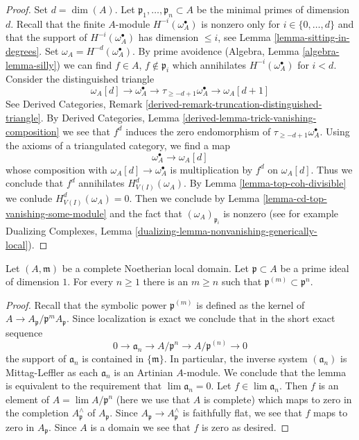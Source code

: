 \begin{proof}
Set $d = \dim(A)$. Let $\mathfrak p_1, \ldots, \mathfrak p_n \subset A$
be the minimal primes of dimension $d$.
Recall that the finite $A$-module
$H^{-i}(\omega_A^\bullet)$ is nonzero only for
$i \in \{0, \ldots, d\}$ and that the support
of $H^{-i}(\omega_A^\bullet)$ has dimension $\leq i$, see
Lemma \ref{lemma-sitting-in-degrees}.
Set $\omega_A = H^{-d}(\omega_A^\bullet)$.
By prime avoidence (Algebra, Lemma \ref{algebra-lemma-silly})
we can find $f \in A$, $f \not \in \mathfrak p_i$
which annihilates $H^{-i}(\omega_A^\bullet)$ for $i < d$.
Consider the distinguished triangle
$$
\omega_A[d] \to \omega_A^\bullet \to
\tau_{\geq -d + 1}\omega_A^\bullet \to \omega_A[d + 1]
$$
See Derived Categories, Remark
\ref{derived-remark-truncation-distinguished-triangle}.
By Derived Categories, Lemma \ref{derived-lemma-trick-vanishing-composition}
we see that $f^d$ induces the zero endomorphism of
$\tau_{\geq -d + 1}\omega_A^\bullet$.
Using the axioms of a triangulated category, we find a map
$$
\omega_A^\bullet \to \omega_A[d]
$$
whose composition with $\omega_A[d] \to \omega_A^\bullet$ is
multiplication by $f^d$ on $\omega_A[d]$.
Thus we conclude that $f^d$ annihilates $H^d_{V(I)}(\omega_A)$.
By Lemma \ref{lemma-top-coh-divisible} we conlude $H^d_{V(I)}(\omega_A) = 0$.
Then we conclude by Lemma \ref{lemma-cd-top-vanishing-some-module}
and the fact that $(\omega_A)_{\mathfrak p_i}$ is nonzero
(see for example
Dualizing Complexes, Lemma
\ref{dualizing-lemma-nonvanishing-generically-local}).
\end{proof}

\begin{lemma}
\label{lemma-inverse-system-symbolic-powers}
Let $(A, \mathfrak m)$ be a complete Noetherian local domain. Let
$\mathfrak p \subset A$ be a prime ideal of dimension $1$.
For every $n \geq 1$ there is an $m \geq n$ such that
$\mathfrak p^{(m)} \subset \mathfrak p^n$.
\end{lemma}

\begin{proof}
Recall that the symbolic power $\mathfrak p^{(m)}$ is defined as the
kernel of $A \to A_\mathfrak p/\mathfrak p^mA_\mathfrak p$.
Since localization is exact we conclude that in the short exact sequence
$$
0 \to \mathfrak a_n \to A/\mathfrak p^n \to A/\mathfrak p^{(n)} \to 0
$$
the support of $\mathfrak a_n$ is contained in $\{\mathfrak m\}$.
In particular, the inverse system $(\mathfrak a_n)$ is Mittag-Leffler
as each $\mathfrak a_n$ is an Artinian $A$-module.
We conclude that the lemma is equivalent to the requirement
that $\lim \mathfrak a_n = 0$. Let $f \in \lim \mathfrak a_n$.
Then $f$ is an element of $A = \lim A/\mathfrak p^n$
(here we use that $A$ is complete)
which maps to zero in the completion $A_\mathfrak p^\wedge$
of $A_\mathfrak p$. Since $A_\mathfrak p \to A_\mathfrak p^\wedge$
is faithfully flat, we see that $f$ maps to zero in $A_\mathfrak p$.
Since $A$ is a domain we see that $f$ is zero as desired.
\end{proof}

